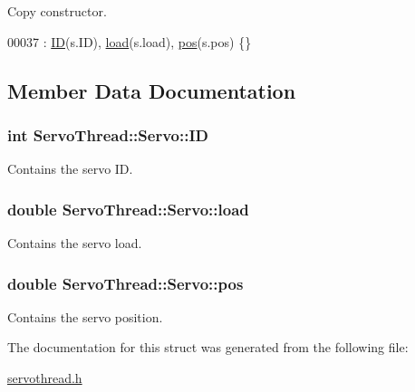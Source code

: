 Copy constructor. 


\begin{DoxyCode}
00037 : \hyperlink{a00006_a06b514c42113aa85fd1703fc88fca7ce}{ID}(s.ID), \hyperlink{a00006_ae378d77acf16b306649c87fdb8df677e}{load}(s.load), \hyperlink{a00006_a9fa0aa56944b9b0bb9d66303d5bd4b59}{pos}(s.pos) \{\}
\end{DoxyCode}


\subsection{Member Data Documentation}
\hypertarget{a00006_a06b514c42113aa85fd1703fc88fca7ce}{}
\subsubsection[{I\+D}]{\setlength{\rightskip}{0pt plus 5cm}int Servo\+Thread\+::\+Servo\+::\+I\+D}\label{a00006_a06b514c42113aa85fd1703fc88fca7ce}


Contains the servo I\+D. 

\hypertarget{a00006_ae378d77acf16b306649c87fdb8df677e}{}
\subsubsection[{load}]{\setlength{\rightskip}{0pt plus 5cm}double Servo\+Thread\+::\+Servo\+::load}\label{a00006_ae378d77acf16b306649c87fdb8df677e}


Contains the servo load. 

\hypertarget{a00006_a9fa0aa56944b9b0bb9d66303d5bd4b59}{}
\subsubsection[{pos}]{\setlength{\rightskip}{0pt plus 5cm}double Servo\+Thread\+::\+Servo\+::pos}\label{a00006_a9fa0aa56944b9b0bb9d66303d5bd4b59}


Contains the servo position. 



The documentation for this struct was generated from the following file\+:\begin{DoxyCompactItemize}
\item 
\hyperlink{a00020}{servothread.\+h}\end{DoxyCompactItemize}
